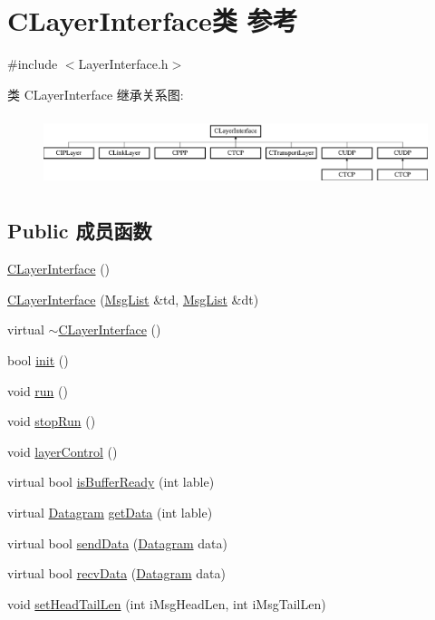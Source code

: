 \hypertarget{class_c_layer_interface}{}\section{C\+Layer\+Interface类 参考}
\label{class_c_layer_interface}


{\ttfamily \#include $<$Layer\+Interface.\+h$>$}

类 C\+Layer\+Interface 继承关系图\+:\begin{figure}[H]
\begin{center}
\leavevmode
\includegraphics[height=2.068965cm]{class_c_layer_interface}
\end{center}
\end{figure}
\subsection*{Public 成员函数}
\begin{DoxyCompactItemize}
\item 
\hyperlink{class_c_layer_interface_a3001e0f4073b4499e4a1146e90de4100}{C\+Layer\+Interface} ()
\item 
\hyperlink{class_c_layer_interface_a505d26b4942bb87ece39152a71bcfb62}{C\+Layer\+Interface} (\hyperlink{class_msg_list}{Msg\+List} \&td, \hyperlink{class_msg_list}{Msg\+List} \&dt)
\item 
virtual \hyperlink{class_c_layer_interface_a75f554caabcadd933724685b9a7121a7}{$\sim$\+C\+Layer\+Interface} ()
\item 
bool \hyperlink{class_c_layer_interface_a82cdd178439031dd581a8f7208f2a134}{init} ()
\item 
void \hyperlink{class_c_layer_interface_a72740530fff12b29c8d1fb23aed88f2c}{run} ()
\item 
void \hyperlink{class_c_layer_interface_aa77c283e1d595a23513ff21cbf72ab97}{stop\+Run} ()
\item 
void \hyperlink{class_c_layer_interface_ad2d30dcc6415c22dd01f87114753d996}{layer\+Control} ()
\item 
virtual bool \hyperlink{class_c_layer_interface_a4979d7b5740c06be048e4b0f1195c8fc}{is\+Buffer\+Ready} (int lable)
\item 
virtual \hyperlink{class_datagram}{Datagram} \hyperlink{class_c_layer_interface_a804d604d3e0032e676d02fd5d369607e}{get\+Data} (int lable)
\item 
virtual bool \hyperlink{class_c_layer_interface_ae5115cf6ee0e76247dac067cc797a06b}{send\+Data} (\hyperlink{class_datagram}{Datagram} data)
\item 
virtual bool \hyperlink{class_c_layer_interface_a72415f0966b67359e0ee885d98827c3f}{recv\+Data} (\hyperlink{class_datagram}{Datagram} data)
\item 
void \hyperlink{class_c_layer_interface_a006961acbffa93cc0936010432b8e612}{set\+Head\+Tail\+Len} (int i\+Msg\+Head\+Len, int i\+Msg\+Tail\+Len)
\end{DoxyCompactItemize}
